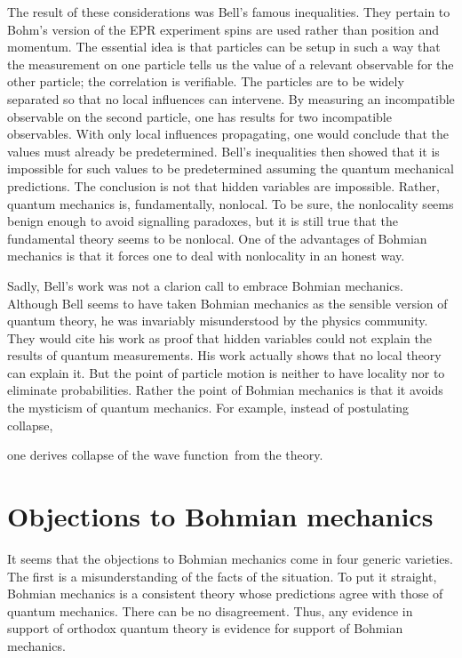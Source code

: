 \documentclass[11pt]{article}
\theoremstyle{remark}
\begin{document}
The result of these considerations was Bell's famous inequalities. They
pertain to Bohm's version of the EPR experiment
 spins are used rather than position and momentum. 
The essential idea is that particles can be setup in such a way that
the measurement on one particle tells us the value of a relevant
observable for the other particle; the correlation is verifiable. 
The particles are to be widely
separated so that no local influences can intervene. By measuring
an incompatible observable on the second particle, one has results for
two incompatible observables. With only local influences propagating,
one would conclude that the values must already be predetermined. 
Bell's inequalities then showed that it is impossible for such values
to be predetermined assuming the quantum mechanical predictions. 
 The conclusion is not that hidden variables are
impossible. Rather, quantum mechanics is, fundamentally, nonlocal. To be sure,
the nonlocality seems benign enough to avoid signalling paradoxes, but
it is still true that the fundamental theory seems to be nonlocal. One
of the advantages of Bohmian mechanics is that it forces one to deal
with nonlocality in an honest way. 

Sadly, Bell's work was not a clarion call to embrace Bohmian
mechanics. Although Bell seems to have taken Bohmian mechanics
as the sensible version of quantum theory, he was invariably
misunderstood by the physics community. They would cite his work as
proof that hidden variables could not explain the results of
quantum measurements. His work actually shows that no local theory 
can explain it. But the point of particle motion is neither to
have locality nor to eliminate probabilities. Rather the point of
Bohmian mechanics is that it avoids the mysticism of quantum
mechanics.  For example, instead of postulating collapse,


one derives 
 collapse of the wave function\ from the theory. 


\section{Objections to Bohmian mechanics}

It seems that the objections to Bohmian mechanics come in four
generic varieties. The first is a misunderstanding of the facts of the
situation. To put it straight, Bohmian mechanics is a consistent
theory whose predictions agree with those of quantum mechanics. There
can be no disagreement. Thus, any evidence in support of orthodox
quantum theory is evidence for support of Bohmian mechanics.
\end{document}
